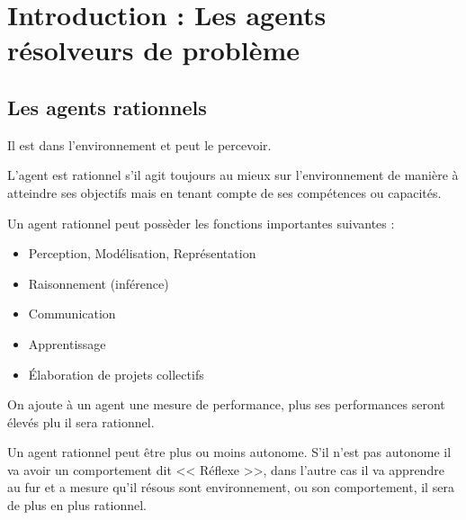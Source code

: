 \documentclass[12pt,a4paper,openany]{book}
\begin{document}
	\thispagestyle{empty} %
	\titleBC 
	\dominitoc
	\setcounter{tocdepth}{1}
	\setcounter{secnumdepth}{3}
	\setcounter{minitocdepth}{1}

	\chapter{Introduction : Les agents résolveurs de problème}
	\section*{Les agents rationnels}
	Il est dans l'environnement et peut le percevoir. 

	\begin{definition}
	L'agent est rationnel s'il agit toujours au mieux sur l'environnement de manière à atteindre ses objectifs mais en tenant compte de ses
	compétences ou capacités.
	\end{definition}

	Un agent rationnel peut possèder les fonctions importantes suivantes : 
	\begin{itemize}
		\item Perception, Modélisation, Représentation	
		\item Raisonnement (inférence)
		\item Communication
		\item Apprentissage
		\item Élaboration de projets collectifs
	\end{itemize}

	On ajoute à un agent une mesure de performance, plus ses performances seront élevés plu il sera rationnel.

	Un agent rationnel peut être plus ou moins autonome. S'il n'est pas autonome il va avoir un comportement dit << Réflexe >>, dans l'autre cas il va
	apprendre au fur et a mesure qu'il résous sont environnement, ou son comportement, il sera de plus en plus rationnel. \\
\end{document}
